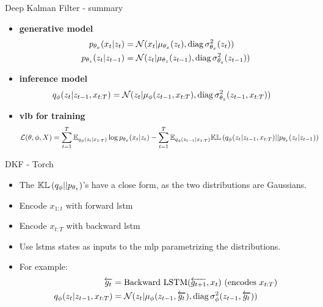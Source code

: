 \begin{frame}{Deep Kalman Filter - summary}
\begin{tcolorbox}[colback=blue!5!white,colframe=black!75!black,title=Deep Kalman Filter]
\begin{itemize}
    \item \textbf{generative model}
    \begin{align}
        \label{gen_model_dkf}
        p_{\theta_x}(x_t \vert z_t) &= \mathcal{N}( x_t \vert \mu_{\theta_x}(z_t), \text{diag}\, \sigma_{\theta_x}^2(z_t))\\
        p_{\theta_z}(z_t \vert z_{t-1}) &= \mathcal{N}( z_t \vert \mu_{\theta_z}(z_{t-1}), \text{diag}\, \sigma_{\theta_z}^2(z_{t-1}))
    \end{align}
    \item \textbf{inference model}
    \begin{align}
        \label{inf_model_dkf}
        q_{\phi}(z_t \vert z_{t-1}, x_{t:T}) &= \mathcal{N}( z_t \vert \mu_{\phi}(z_{t-1}, x_{t:T}), \text{diag}\, \sigma_{\theta_z}^2(z_{t-1},x_{t:T}))
    \end{align}
    \item \textbf{\gls{vlb} for training}
    \begin{align}
        \label{vlb_dkf}
        \mathcal{L}(\theta, \phi, X) &= \sum_{t=1}^T \mathbb{E}_{q_\phi(z_{t} \vert x_{1:T})} \log{p_{\theta_x}(x_t \vert z_t)} - \sum_{t=1}^T \mathbb{E}_{q_\phi(z_{t-1} \vert x_{1:T})} \mathbb{KL}\left( q_{\phi}(z_t \vert z_{t-1}, x_{t:T}) \vert\vert p_{\theta_z}(z_t \vert z_{t-1}) \right)
    \end{align}
\end{itemize}
\end{tcolorbox}
\end{frame}

\begin{frame}{DKF - Torch}
    \begin{itemize}
        \item The $\mathbb{KL}\left( q_\phi \vert\vert p_{\theta_z} \right)$'s have a close form, as the two distributions are Gaussians. %
        \item Encode $x_{1:t}$ with forward \gls{lstm}
        \item Encode $x_{t:T}$ with backward \gls{lstm} 
        \item Use \glspl{lstm} states as inputs to the \gls{mlp} parametrizing the distributions. 
        \item For example:
            \begin{align*}
                \overleftarrow{g_t} &= \text{Backward LSTM}(\overleftarrow{g_{t+1}}, x_t) \,\, (\text{encodes} \,\, x_{t:T}) \\
                q_{\phi}(z_t \vert z_{t-1}, x_{t:T}) &= \mathcal{N}( z_t \vert \mu_{\phi}(z_{t-1}, \overleftarrow{g_t}), \text{diag}\, \sigma_{\phi}^2(z_{t-1}, \overleftarrow{g_t}))
            \end{align*}
    \end{itemize}
\end{frame}


